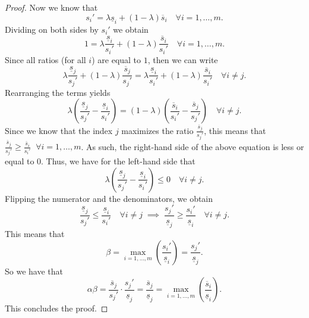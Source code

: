 \documentclass{article}
\begin{document}
\begin{proof}
	Now we know that 
	\[
	s_i' = \lambda \underline{s}_i + (1 - \lambda) \overline{s}_i \quad \forall i=1,\ldots,m. 	
	\]
	Dividing on both sides by \(s_i'\) we obtain 
	\[
	1 = \lambda \frac{\underline{s}_i}{s_i'} + (1 - \lambda) \frac{\overline{s}_i}{s_i'}\quad \forall i=1,\ldots,m.
	\]
	Since all ratios (for all \(i\)) are equal to \(1\), then we can write
	\[
	\lambda \frac{\underline{s}_j}{s_j'} + (1 - \lambda) \frac{\overline{s}_j}{s_j'} = \lambda \frac{\underline{s}_i}{s_i'} + (1 - \lambda) \frac{\overline{s}_i}{s_i'}\quad \forall i \neq j.
	\]
	Rearranging the terms yields
	\[
	\lambda \left(\frac{\underline{s}_j}{s_j'} - \frac{\underline{s}_i}{s_i'}\right) =  (1 - \lambda)\left(\frac{\overline{s}_i}{s_i'} - \frac{\overline{s}_j}{s_j'}\right)\quad \forall i \neq j.
	\]
	Since we know that the index \(j\) maximizes the ratio
	\(\frac{\overline{s}_{j}}{s_{j}'}\), this means that \(\frac{\overline{s}_{j}}{s_{j}'} \geq \frac{\overline{s}_{i}}{s_{i}'} \;\;\forall i=1,\ldots,m\). 
	As such, the right-hand side of the above equation is less or equal to \(0\). 
	Thus, we have for the left-hand side that 
	\[
	\lambda \left(\frac{\underline{s}_j}{s_j'} - \frac{\underline{s}_i}{s_i'}\right) \leq 0 \quad \forall i \neq j.
	\]
	Flipping the numerator and the denominators, we obtain
	\[
	\frac{\underline{s}_j}{s_j'} \leq \frac{\underline{s}_i}{s_i'} \quad \forall i \neq j \;\implies\; \frac{s_j'}{\underline{s}_j} \geq \frac{s_i'}{\underline{s}_i} \quad \forall i \neq j.
	\]
	This means that 
	\[
	\beta = \max_{i=1,\dots,m} \left(\frac{s_i'}{\underline{s}_i}\right) = \frac{s_j'}{\underline{s}_j}.
	\]
	So we have that 
	\[\alpha \beta = \frac{\overline{s}_j}{s_j'} \cdot \frac{s_j'}{\underline{s}_j} = \frac{\overline{s}_j}{\underline{s}_j} = \max_{i=1,\dots,m} \left(\frac{\overline{s}_i}{\underline{s}_i}\right).\]
	This concludes the proof.
\end{proof}
\end{document}
